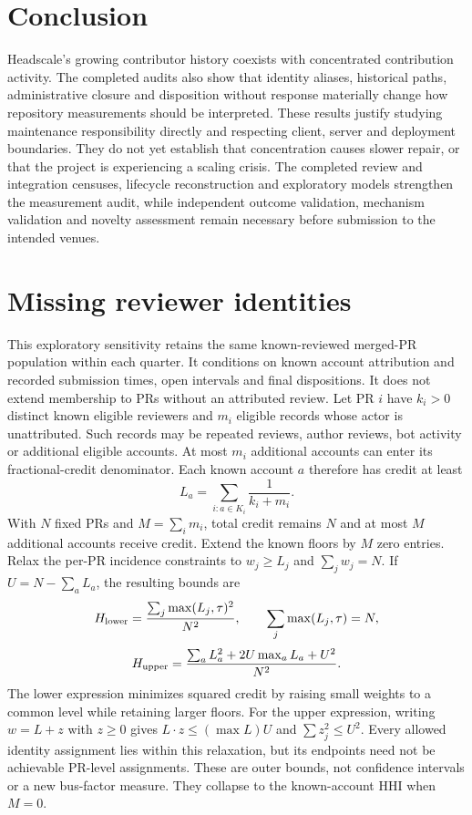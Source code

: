 \documentclass[11pt]{article}
\begin{document}
\section{Conclusion}
Headscale's growing contributor history coexists with concentrated contribution
activity. The completed audits also show that identity aliases, historical paths,
administrative closure and disposition without response materially change how
repository measurements should be interpreted. These results justify studying
maintenance responsibility directly and respecting client, server and deployment
boundaries. They do not yet establish that concentration causes slower repair,
or that the project is experiencing a scaling crisis. The completed review and
integration censuses, lifecycle reconstruction and exploratory models strengthen
the measurement audit, while independent outcome validation, mechanism validation
and novelty assessment remain
necessary before submission to the intended venues.

\clearpage
\appendix
\section{Missing reviewer identities}\label{sec:identitybounds}
This exploratory sensitivity retains the same known-reviewed merged-PR
population within each quarter. It conditions on known account attribution and
recorded submission times, open intervals and final dispositions. It does not
extend membership to PRs without an attributed review. Let PR $i$ have $k_i>0$
distinct known eligible reviewers and $m_i$ eligible records whose actor is
unattributed. Such records may be repeated reviews, author reviews, bot activity
or additional eligible accounts. At most $m_i$ additional accounts can enter its
fractional-credit denominator. Each known account $a$ therefore has credit at
least
\[
L_a=\sum_{i:a\in K_i}\frac{1}{k_i+m_i}.
\]
With $N$ fixed PRs and $M=\sum_i m_i$, total credit remains $N$ and at most $M$
additional accounts receive credit. Extend the known floors by $M$ zero entries.
Relax the per-PR incidence constraints
to $w_j\geq L_j$ and $\sum_j w_j=N$. If $U=N-\sum_a L_a$, the resulting bounds are
\[
H_{\rm lower}=\frac{\sum_j\max(L_j,\tau)^2}{N^2},\qquad
\sum_j\max(L_j,\tau)=N,
\]
\[
H_{\rm upper}=
\frac{\sum_a L_a^2+2U\max_a L_a+U^2}{N^2}.
\]
The lower expression minimizes squared credit by raising small weights to a
common level while retaining larger floors. For the upper expression, writing
$w=L+z$ with $z\geq0$ gives $L\cdot z\leq(\max L)U$ and
$\sum z_j^2\leq U^2$. Every allowed identity assignment lies within this
relaxation, but its endpoints need not be achievable PR-level assignments.
These are outer bounds, not confidence intervals or a new bus-factor measure.
They collapse to the known-account HHI when $M=0$.
\end{document}
